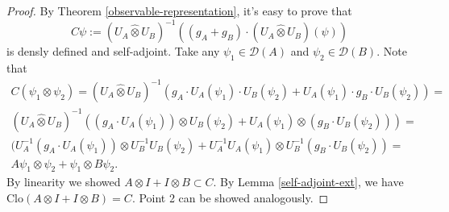 \documentclass[main.tex]{subfiles}
\begin{document}
\begin{proof}
By Theorem \ref{observable-representation}, it's easy to prove that 
\begin{equation}
C\psi:= (U_A \hat{\otimes} U_B)^{-1}((g_A + g_B)\cdot (U_A \hat{\otimes} U_B)(\psi))
\end{equation}
is densly defined and self-adjoint. Take any $\psi_1\in\mathcal{D}(A)$ and $\psi_2\in\mathcal{D}(B)$.
Note that 
\begin{multline}
C(\psi_1 \otimes \psi_2) = (U_A \hat{\otimes} U_B)^{-1}(g_A\cdot U_A(\psi_1)\cdot U_B(\psi_2) + U_A(\psi_1)\cdot g_B \cdot U_B(\psi_2))
= \\ 
(U_A \hat{\otimes} U_B)^{-1}((g_A\cdot U_A(\psi_1))\otimes U_B(\psi_2) + U_A(\psi_1)\otimes (g_B \cdot U_B(\psi_2))) = \\
(U_A^{-1}(g_A\cdot U_A(\psi_1))\otimes U_B^{-1}U_B(\psi_2) + U_A^{-1}U_A(\psi_1)\otimes U_B^{-1}(g_B \cdot U_B(\psi_2)) = \\
A\psi_1 \otimes \psi_2 + \psi_1 \otimes B\psi_2.
\end{multline}
By linearity we showed $A\otimes I + I \otimes B \subset C$. By Lemma \ref{self-adjoint-ext}, we have $\text{Clo}(A\otimes I + I \otimes B) = C$. Point 2 can be showed analogously.
\end{proof}
\end{document}
